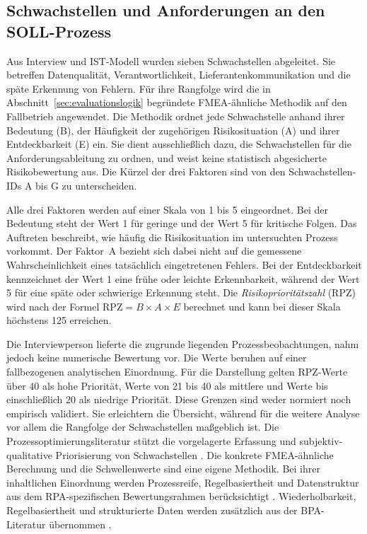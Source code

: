 \documentclass[a4paper,12pt]{article}
\begin{document}
\subsection{Schwachstellen und Anforderungen an den SOLL-Prozess}
\label{sec:schwachstellen-anforderungen}
Aus Interview und IST-Modell wurden sieben Schwachstellen abgeleitet. Sie betreffen Datenqualität, Verantwortlichkeit, Lieferantenkommunikation und die späte Erkennung von Fehlern. Für ihre Rangfolge wird die in Abschnitt~\ref{sec:evaluationslogik} begründete FMEA-ähnliche Methodik auf den Fallbetrieb angewendet. Die Methodik ordnet jede Schwachstelle anhand ihrer Bedeutung (B), der Häufigkeit der zugehörigen Risikosituation (A) und ihrer Entdeckbarkeit (E) ein. Sie dient ausschließlich dazu, die Schwachstellen für die Anforderungsableitung zu ordnen, und weist keine statistisch abgesicherte Risikobewertung aus. Die Kürzel der drei Faktoren sind von den Schwachstellen-IDs A bis G zu unterscheiden.

Alle drei Faktoren werden auf einer Skala von 1 bis 5 eingeordnet. Bei der Bedeutung steht der Wert 1 für geringe und der Wert 5 für kritische Folgen. Das Auftreten beschreibt, wie häufig die Risikosituation im untersuchten Prozess vorkommt. Der Faktor~A bezieht sich dabei nicht auf die gemessene Wahrscheinlichkeit eines tatsächlich eingetretenen Fehlers. Bei der Entdeckbarkeit kennzeichnet der Wert 1 eine frühe oder leichte Erkennbarkeit, während der Wert 5 für eine späte oder schwierige Erkennung steht. Die \textit{Risikoprioritätszahl} (RPZ) wird nach der Formel \(\mathrm{RPZ}=B \times A \times E\) berechnet und kann bei dieser Skala höchstens 125 erreichen.

Die Interviewperson lieferte die zugrunde liegenden Prozessbeobachtungen, nahm jedoch keine numerische Bewertung vor. Die Werte beruhen auf einer fallbezogenen analytischen Einordnung. Für die Darstellung gelten RPZ-Werte über 40 als hohe Priorität, Werte von 21 bis 40 als mittlere und Werte bis einschließlich 20 als niedrige Priorität. Diese Grenzen sind weder normiert noch empirisch validiert. Sie erleichtern die Übersicht, während für die weitere Analyse vor allem die Rangfolge der Schwachstellen maßgeblich ist. Die Prozessoptimierungsliteratur stützt die vorgelagerte Erfassung und subjektiv-qualitative Priorisierung von Schwachstellen \parencite{kompetenzzentrum_augsburg_prozessoptimierung_2020}. Die konkrete FMEA-ähnliche Berechnung und die Schwellenwerte sind eine eigene Methodik. Bei ihrer inhaltlichen Einordnung werden Prozessreife, Regelbasiertheit und Datenstruktur aus dem RPA-spezifischen Bewertungsrahmen berücksichtigt \parencite{wellmann_framework_2020}. Wiederholbarkeit, Regelbasiertheit und strukturierte Daten werden zusätzlich aus der BPA-Literatur übernommen \parencite{moreira_business_2024}.
\end{document}

